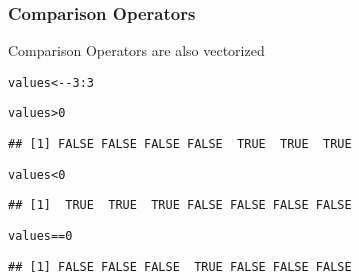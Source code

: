 \documentclass[12pt]{beamer}\usepackage[]{graphicx}\usepackage[]{color}
\makeatletter
\newcommand{\hlnum}[1]{\textcolor[rgb]{0.686,0.059,0.569}{#1}}%
\newcommand{\hlopt}[1]{\textcolor[rgb]{0,0,0}{#1}}%
\newcommand{\hlstd}[1]{\textcolor[rgb]{0.345,0.345,0.345}{#1}}%
\newcommand{\hlkwb}[1]{\textcolor[rgb]{0.69,0.353,0.396}{#1}}%
\newenvironment{kframe}{%
 \def\at@end@of@kframe{}%
 \ifinner\ifhmode%
  \def\at@end@of@kframe{\end{minipage}}%
  \begin{minipage}{\columnwidth}%
 \fi\fi%
 \def\FrameCommand##1{\hskip\@totalleftmargin \hskip-\fboxsep
 \colorbox{shadecolor}{##1}\hskip-\fboxsep
     \hskip-\linewidth \hskip-\@totalleftmargin \hskip\columnwidth}%
 \MakeFramed {\advance\hsize-\width
   \@totalleftmargin\z@ \linewidth\hsize
   \@setminipage}}%
 {\par\unskip\endMakeFramed%
 \at@end@of@kframe}
\newenvironment{knitrout}{}{} %
\makeatother
\begin{document}

\begin{frame}[fragile]
\frametitle{Comparison Operators}

Comparison Operators are also vectorized 
\begin{knitrout}\footnotesize
{}\color{fgcolor}\begin{kframe}
\begin{alltt}
\hlstd{values} \hlkwb{<-} \hlopt{-}\hlnum{3}\hlopt{:}\hlnum{3}

\hlstd{values} \hlopt{>} \hlnum{0}
\end{alltt}
\begin{verbatim}
## [1] FALSE FALSE FALSE FALSE  TRUE  TRUE  TRUE
\end{verbatim}
\begin{alltt}
\hlstd{values} \hlopt{<} \hlnum{0}
\end{alltt}
\begin{verbatim}
## [1]  TRUE  TRUE  TRUE FALSE FALSE FALSE FALSE
\end{verbatim}
\begin{alltt}
\hlstd{values} \hlopt{==} \hlnum{0}
\end{alltt}
\begin{verbatim}
## [1] FALSE FALSE FALSE  TRUE FALSE FALSE FALSE
\end{verbatim}
\end{kframe}
\end{knitrout}

\end{frame}

\end{document}
